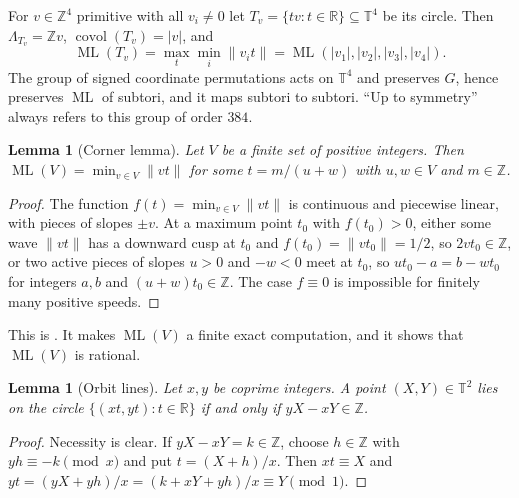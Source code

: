 \documentclass[12pt]{amsart}
\newtheorem{lemma}[theorem]{Lemma}
\theoremstyle{definition}\newtheorem{definition}[theorem]{Definition}
\theoremstyle{remark}\newtheorem{remark}[theorem]{Remark}
\newcommand{\Z}{\mathbb Z}\newcommand{\R}{\mathbb R}\newcommand{\T}{\mathbb T}
\newcommand{\norm}[1]{\lVert #1\rVert}
\newcommand{\ML}{\operatorname{ML}}
\newcommand{\covol}{\operatorname{covol}}
\newcommand{\eucl}[1]{\lvert #1\rvert}
\begin{document}
For $v\in\Z^4$ primitive with all $v_i\ne 0$ let $T_v=\{tv:t\in\R\}\subseteq\T^4$ be its circle. Then $\Lambda_{T_v}=\Z v$, $\covol(T_v)=\eucl v$, and
\[
 \ML(T_v)=\max_t\min_i\norm{v_it}=\ML(|v_1|,|v_2|,|v_3|,|v_4|).
\]
The group of signed coordinate permutations acts on $\T^4$ and preserves $G$, hence preserves $\ML$ of subtori, and it maps subtori to subtori. ``Up to symmetry'' always refers to this group of order $384$.

\begin{lemma}[Corner lemma]\label{lem:corner}
Let $V$ be a finite set of positive integers. Then $\ML(V)=\min_{v\in V}\norm{vt}$ for some $t=m/(u+w)$ with $u,w\in V$ and $m\in\Z$.
\end{lemma}
\begin{proof}
The function $f(t)=\min_{v\in V}\norm{vt}$ is continuous and piecewise linear, with pieces of slopes $\pm v$. At a maximum point $t_0$ with $f(t_0)>0$, either some wave $\norm{vt}$ has a downward cusp at $t_0$ and $f(t_0)=\norm{vt_0}=1/2$, so $2vt_0\in\Z$, or two active pieces of slopes $u>0$ and $-w<0$ meet at $t_0$, so $ut_0-a=b-wt_0$ for integers $a,b$ and $(u+w)t_0\in\Z$. The case $f\equiv 0$ is impossible for finitely many positive speeds.
\end{proof}
This is \cite[Proposition~4.1]{Kravitz}. It makes $\ML(V)$ a finite exact computation, and it shows that $\ML(V)$ is rational.

\begin{lemma}[Orbit lines]\label{lem:orbit}
Let $x,y$ be coprime integers. A point $(X,Y)\in\T^2$ lies on the circle $\{(xt,yt):t\in\R\}$ if and only if $yX-xY\in\Z$.
\end{lemma}
\begin{proof}
Necessity is clear. If $yX-xY=k\in\Z$, choose $h\in\Z$ with $yh\equiv -k\pmod x$ and put $t=(X+h)/x$. Then $xt\equiv X$ and $yt=(yX+yh)/x=(k+xY+yh)/x\equiv Y\pmod 1$.
\end{proof}
\end{document}
